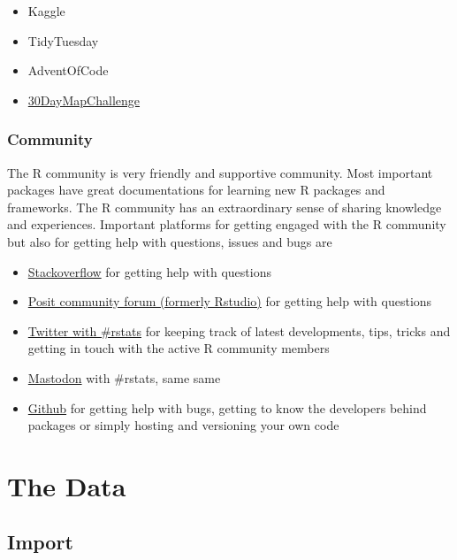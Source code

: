 \documentclass[
  letterpaper,
  DIV=11,
  numbers=noendperiod]{scrreprt}
\begin{document}
\begin{itemize}
\item
  Kaggle
\item
  TidyTuesday
\item
  AdventOfCode
\item
  \href{https://30daymapchallenge.com/}{30DayMapChallenge}
\end{itemize}

\hypertarget{community}{%
\subsection{Community}\label{community}}

The R community is very friendly and supportive community. Most
important packages have great documentations for learning new R packages
and frameworks. The R community has an extraordinary sense of sharing
knowledge and experiences. Important platforms for getting engaged with
the R community but also for getting help with questions, issues and
bugs are

\begin{itemize}
\item
  \href{https://stackoverflow.com/questions/tagged/r}{Stackoverflow} for
  getting help with questions
\item
  \href{https://community.rstudio.com/}{Posit community forum (formerly
  Rstudio)} for getting help with questions
\item
  \href{https://twitter.com/search?q=\%23rstats\&src=typed_query}{Twitter
  with \#rstats} for keeping track of latest developments, tips, tricks
  and getting in touch with the active R community members
\item
  \href{https://mastodon.social/}{Mastodon} with \#rstats, same same
\item
  \href{https://github.com/}{Github} for getting help with bugs, getting
  to know the developers behind packages or simply hosting and
  versioning your own code
\end{itemize}


\hypertarget{the-data}{%
\chapter{The Data}\label{the-data}}

\hypertarget{import}{%
\section{Import}\label{import}}
\end{document}
